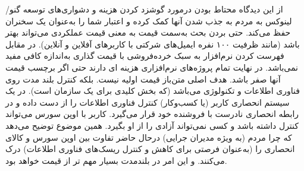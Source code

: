
از این دیدگاه محتاط بودن درمورد گوشزد کردن هزینه و دشواری‌های توسعه گنو/لینوکس
به مردم به جذب شدن آنها کمک کرده و اعتبار شما را به‌عنوان یک سخنران حفظ می‌کند.
حتی بردن بحث به‌سمت قیمت به معنی قیمت عملکردی می‌تواند بهتر باشد
(مانند ظرفیت ۱۰۰ نفره ایمیل‌های شرکتی با کاربر‌های آفلاین و آنلاین).
در مقابل فهرست کردن نرم‌افزار به سبک خرده‌فروشی با قیمت گذاری به‌اندازه کافی مفید نمی‌باشد.
در نهایت تمام پروژه‌های نرم‌افزاری هزینه ای دارند حتی اگر برچسب قیمت آنها صفر باشد.
هدف اصلی متن‌باز قیمت اولیه نیست. بلکه کنترل بلند مدت روی فناوری اطلاعات و تکنولوژی می‌باشد
(که بخش کلیدی برای یک سازمان است). در یک سیستم انحصاری کاربر (یا کسب‌و‌کار) کنترل فناوری اطلاعات
را از دست داده و در رابطه انحصاری نادرست با فروشنده خود قرار می‌گیرد.
کاربر با اوپن سورس می‌تواند کنترل داشته باشد و کسی نمی‌تواند آزادی را از او بگیرد.
همین موضوع توضیح می‌دهد که چرا مردم (به ویژه مدیران جرایی) درحال حاضر تفاوت بین 
اوپن سورس و کالای انحصاری را (به‌عنوان فرصتی برای کاهش و کنترل ریسک‌های فناوری اطلاعات)
درک می‌کنند. و این امر در بلندمدت بسیار مهم تر از قیمت خواهد بود.

